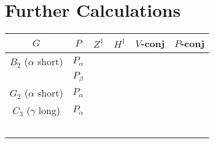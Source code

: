 
\chapter{Further Calculations}
\label{AppendixA}

\begin{tabular}{|c||c|c|c|c|c|}
	\hline
	$G$ & $P$ & $Z^1$ & $H^1$ & $V$-conj & $P$-conj \\
	\hline
	$B_2$ ($\alpha$ short) & $P_\alpha$ & \checkmark & \checkmark & \checkmark & \checkmark \\
	\hline
	 & $P_\beta$ & \checkmark & \checkmark & \checkmark & \checkmark \\
	\hline
	$G_2$ ($\alpha$ short) & $P_\alpha$ & \checkmark &  &  &  \\
	\hline
	$C_3$ ($\gamma$ long) & $P_\alpha$ & \checkmark &  &  &  \\
	\hline
	 &  &  &  &  &  \\
	\hline
	 &  &  &  &  &  \\
	\hline
	 &  &  &  &  &  \\
	\hline
	 &  &  &  &  &  \\
	\hline
	 &  &  &  &  &  \\
	\hline
\end{tabular}
